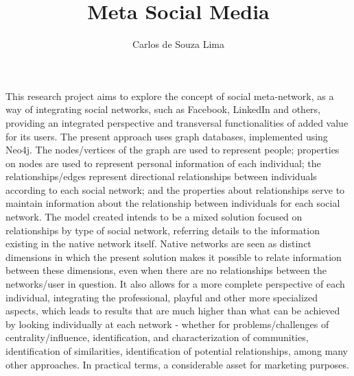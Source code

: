 \documentclass[a4paper,twoside]{report}
\begin{document}

\title{Meta Social Media}

\author{Carlos de Souza Lima}


\beforepreface

This research project aims to explore the concept of social meta-network, as a way of integrating social networks, such as Facebook, LinkedIn and others, providing an integrated perspective and transversal functionalities of added value for its users. The present approach uses graph databases, implemented using Neo4j. The nodes/vertices of the graph are used to represent people; properties on nodes are used to represent personal information of each individual; the relationships/edges represent directional relationships between individuals according to each social network; and the properties about relationships serve to maintain information about the relationship between individuals for each social network. The model created intends to be a mixed solution focused on relationships by type of social network, referring details to the information existing in the native network itself. Native networks are seen as distinct dimensions in which the present solution makes it possible to relate information between these dimensions, even when there are no relationships between the networks/user in question. It also allows for a more complete perspective of each individual, integrating the professional, playful and other more specialized aspects, which leads to results that are much higher than what can be achieved by looking individually at each network - whether for problems/challenges of centrality/influence, identification, and characterization of communities, identification of similarities, identification of potential relationships, among many other approaches. In practical terms, a considerable asset for marketing purposes.

\afterpreface

\bodystart
 







%
\end{document}
